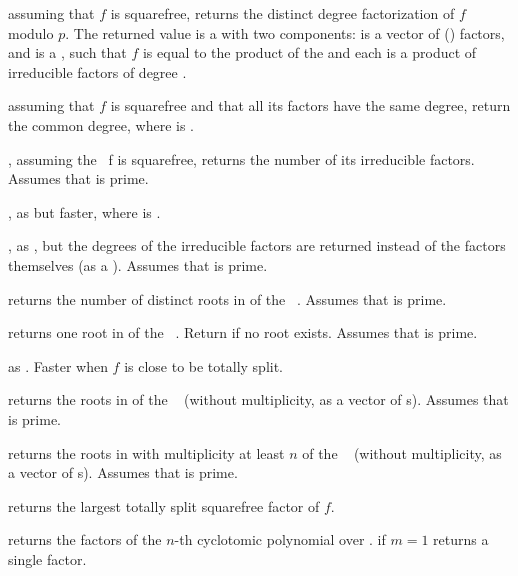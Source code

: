  assuming that $f$ is squarefree,
returns the distinct degree factorization of $f$ modulo $p$.
The returned value  is a  with two
components:  is a vector of ()
factors, and  is a , such that
$f$ is equal to the product of the  and each 
is a product of irreducible factors of degree .

 assuming that $f$ is squarefree
and that all its factors have the same degree, return the common degree,
where  is .

, assuming the ~f is squarefree,
returns the number of its irreducible factors. Assumes that  is prime.

, as
 but faster,
where  is .

, as , but the
degrees of the irreducible factors are returned instead of the factors
themselves (as a ). Assumes that  is prime.

 returns the number of distinct
roots in  of the ~. Assumes that  is prime.

 returns one root in  of
the ~. Return  if no root exists.
Assumes that  is prime.

 as .
Faster when $f$ is close to be totally split.

 returns the roots in  of
the ~ (without multiplicity, as a vector of s).
Assumes that  is prime.

returns the roots in  with multiplicity at least $n$ of
the ~ (without multiplicity, as a vector of s).
Assumes that  is prime.

 returns the largest totally split
squarefree factor of $f$.

 returns the factors
of the $n$-th cyclotomic polynomial over . if $m=1$ returns
a single factor.

